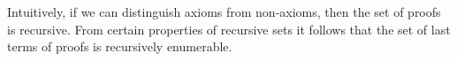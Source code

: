 

\setcounter{section}{3}
\setcounter{subsection}{5}
\setcounter{dfn}{33}

Intuitively, if we can distinguish axioms from non-axioms, then the set of proofs is recursive.
From certain properties of recursive sets it follows that the set of last terms of proofs is recursively enumerable.




